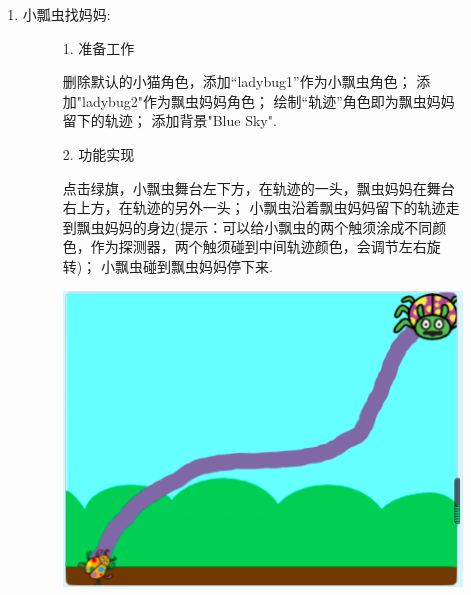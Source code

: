 \documentclass[10pt, a4paper]{article}
\begin{document}
\begin{enumerate}
        \item 小瓢虫找妈妈:
        \begin{figure}[htbp]
            \begin{minipage}{.6\textwidth}
                1. 准备工作
                \begin{tasks}[label = (\arabic*)]
                    \task 删除默认的小猫角色，添加“ladybug1”作为小飘虫角色；
                    \task 添加"ladybug2"作为飘虫妈妈角色；
                    \task 绘制“轨迹”角色即为飘虫妈妈留下的轨迹；
                    \task 添加背景"Blue Sky".
                \end{tasks}
                2. 功能实现
                \begin{tasks}[label = (\arabic*)]
                    \task 点击绿旗，小飘虫舞台左下方，在轨迹的一头，飘虫妈妈在舞台右上方，在轨迹的另外一头；
                    \task 小飘虫沿着飘虫妈妈留下的轨迹走到飘虫妈妈的身边(提示：可以给小飘虫的两个触须涂成不同颜色，作为探测器，两个触须碰到中间轨迹颜色，会调节左右旋转)；
                    \task 小飘虫碰到飘虫妈妈停下来.
                \end{tasks}
            \end{minipage}
            \begin{minipage}{.37\textwidth}
                \centering
                \includegraphics[width=\textwidth]{37.png}
            \end{minipage}
        \end{figure}
    \end{enumerate}
\end{document}
